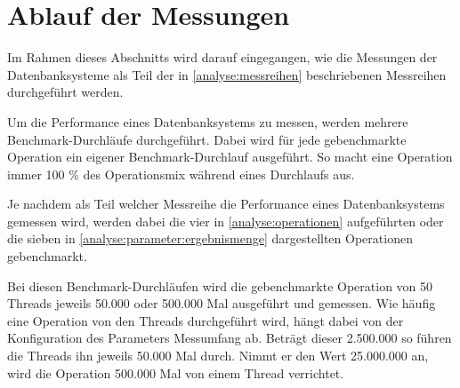\section{Ablauf der Messungen}
Im Rahmen dieses Abschnitts wird darauf eingegangen, wie die Messungen der Datenbanksysteme als Teil der in \autoref{analyse:messreihen} beschriebenen Messreihen durchgeführt werden. 

Um die Performance eines Datenbanksystems zu messen, werden mehrere Benchmark-Durchläufe durchgeführt. Dabei wird für jede gebenchmarkte Operation ein eigener Benchmark-Durchlauf ausgeführt. So macht eine Operation immer 100 \% des Operationsmix während eines Durchlaufs aus. 

Je nachdem als Teil welcher Messreihe die Performance eines Datenbanksystems gemessen wird, werden dabei die vier in \autoref{analyse:operationen} aufgeführten oder die sieben in \autoref{analyse:parameter:ergebnismenge} dargestellten Operationen gebenchmarkt. 

Bei diesen Benchmark-Durchläufen wird die gebenchmarkte Operation von 50 Threads jeweils 50.000 oder 500.000 Mal ausgeführt und gemessen. Wie häufig eine Operation von den Threads durchgeführt wird, hängt dabei von der Konfiguration des Parameters Messumfang ab. Beträgt dieser 2.500.000 so führen die Threads ihn jeweils 50.000 Mal durch. Nimmt er den Wert 25.000.000 an, wird die Operation 500.000 Mal von einem Thread verrichtet. 